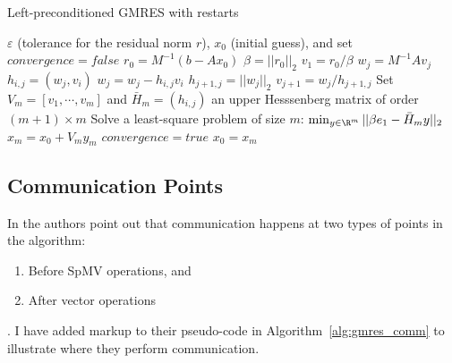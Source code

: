 \documentclass[10pt]{article}
\begin{document}
\begin{algorithm}                      %
\caption{Left-preconditioned GMRES with restarts}          %
\label{alg:gmres}                           %
\begin{algorithmic}[1]                    %
    \State $\varepsilon$ (tolerance for the residual norm $r$), $x_0$ (initial guess), and set $convergence = false$
    \State $r_0 = M^{-1} (b-Ax_0)$ 
    \State $\beta = ||r_0||_2$
    \State $v_1 = r_0 / \beta$ 
	 \label{alg:gmres_rotation_loop_start} 
			\State $w_j = M^{-1} A v_j$
			\label{alg:gmres_inner_loop_start}  
				\State $h_{i,j} = (w_j, v_i)$ 
				\State $w_j = w_j - h_{i,j} v_i$
			\EndFor \label{alg:gmres_inner_loop_stop}
			\State $h_{j+1, j}  = ||w_j||_2$			
			\State $v_{j+1} = w_j / h_{j+1,j}$		
	\EndFor\label{alg:gmres_rotation_loop_stop} 
	\State Set $V_m = [v_1, \cdots, v_m]$ and $\bar{H}_m = (h_{i,j})$ an upper Hesssenberg matrix of order $(m+1)\times m$
	\State \label{alg:gmres_least_squares} Solve a least-square problem of size $m$: $\min_{y \in \R^m} ||\beta e_1 - \bar{H}_m y||_2$	
	\State $x_m = x_0 + V_m y_m$ \label{alg:gmres_residual_norm}
		\State $convergence = true$
	\EndIf
	\State $x_0 = x_m$
    \EndWhile
\end{algorithmic}
\end{algorithm}

\subsection{Communication Points} 

In \cite{Bahi2011} the authors point out that communication happens at two types of points in the algorithm: \begin{enumerate} \item Before SpMV operations, and \item After vector operations \end{enumerate}. I have added markup to their pseudo-code in Algorithm~\ref{alg:gmres_comm} to illustrate where they perform communication. 
\end{document}
